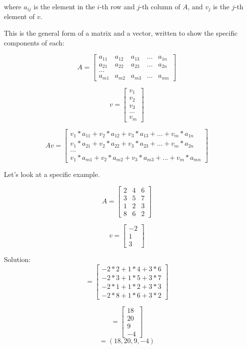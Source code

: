 where $a_{ij}$ is the element in the $i$-th row and $j$-th column of $A$, and $v_j$ is the $j$-th element of $v$.

This is the general form of a matrix and a vector, written to show the specific components of each:


 $$A = \begin{bmatrix}
 a_{11} &a_{12}  &a_{13} &... &a_{1n}  \\
 a_{21} &a_{22}  &a_{23} &... &a_{2n}  \\
 ... \\
 a_{m1} &a_{m2}  &a_{m3} &... &a_{mn}  
\end{bmatrix}$$

$$v = \begin{bmatrix}
 v_{1}  \\
 v_{2} \\
 v_{3} \\
 ... \\
 v_{m} 
\end{bmatrix}$$

 $$Av =\begin{bmatrix}
 v_{1}*a_{11} +v_{2}*a_{12}  +v_{3}*a_{13} +... +v_{m}*a_{1n}  \\
 v_{1}*a_{21} +v_{2}*a_{22}  +v_{3}*a_{23} +... +v_{m}*a_{2n}  \\
 ... \\
 v_{1}*a_{m1} +v_{2}*a_{m2}  +v_{3}*a_{m3} +... +v_{m}*a_{mn}  
\end{bmatrix}$$

Let's look at a specific example.

$$A = \begin{bmatrix}
 2  &4 &6  \\
 3  &5 &7  \\
 1  &2 &3  \\
 8  &6 &2 
\end{bmatrix}$$

$$v = \begin{bmatrix}
 -2  \\
 1 \\
 3 
\end{bmatrix}$$

Solution:
$$= \begin{bmatrix}
-2*2+1*4+3*6\\
-2*3+1*5+3*7\\
 -2*1+1*2+3*3\\
-2*8+1*6+3*2
\end{bmatrix}$$

$$= \begin{bmatrix}
18 \\
20\\
9\\
-4 
\end{bmatrix}$$
$$= (18,20,9,-4)$$


